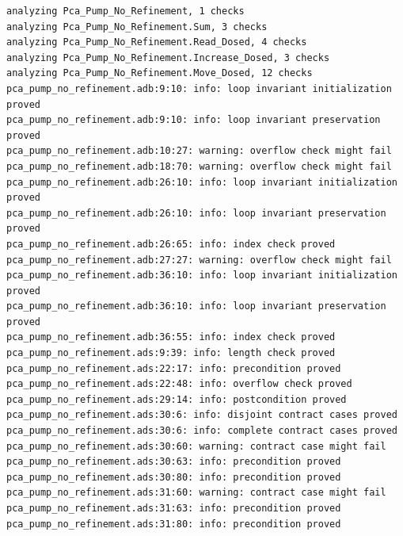 \singlespacing
\begin{lstlisting}[frame=single, gobble=0, caption={GNATprove verification summary of module for dose monitoring in SPARK 2014 without variable refinement}, label={listing:pca_pump_move_dosed_unit_spark2014_gnatprove_no_refinement}]
analyzing Pca_Pump_No_Refinement, 1 checks
analyzing Pca_Pump_No_Refinement.Sum, 3 checks
analyzing Pca_Pump_No_Refinement.Read_Dosed, 4 checks
analyzing Pca_Pump_No_Refinement.Increase_Dosed, 3 checks
analyzing Pca_Pump_No_Refinement.Move_Dosed, 12 checks
pca_pump_no_refinement.adb:9:10: info: loop invariant initialization proved
pca_pump_no_refinement.adb:9:10: info: loop invariant preservation proved
pca_pump_no_refinement.adb:10:27: warning: overflow check might fail
pca_pump_no_refinement.adb:18:70: warning: overflow check might fail
pca_pump_no_refinement.adb:26:10: info: loop invariant initialization proved
pca_pump_no_refinement.adb:26:10: info: loop invariant preservation proved
pca_pump_no_refinement.adb:26:65: info: index check proved
pca_pump_no_refinement.adb:27:27: warning: overflow check might fail
pca_pump_no_refinement.adb:36:10: info: loop invariant initialization proved
pca_pump_no_refinement.adb:36:10: info: loop invariant preservation proved
pca_pump_no_refinement.adb:36:55: info: index check proved
pca_pump_no_refinement.ads:9:39: info: length check proved
pca_pump_no_refinement.ads:22:17: info: precondition proved
pca_pump_no_refinement.ads:22:48: info: overflow check proved
pca_pump_no_refinement.ads:29:14: info: postcondition proved
pca_pump_no_refinement.ads:30:6: info: disjoint contract cases proved
pca_pump_no_refinement.ads:30:6: info: complete contract cases proved
pca_pump_no_refinement.ads:30:60: warning: contract case might fail
pca_pump_no_refinement.ads:30:63: info: precondition proved
pca_pump_no_refinement.ads:30:80: info: precondition proved
pca_pump_no_refinement.ads:31:60: warning: contract case might fail
pca_pump_no_refinement.ads:31:63: info: precondition proved
pca_pump_no_refinement.ads:31:80: info: precondition proved
\end{lstlisting}
\doublespacing
